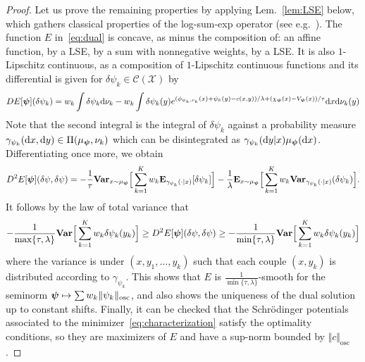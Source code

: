 \documentclass[11pt]{article}
\newcommand{\rev}[1]{{#1}}
\newcommand{\Cc}{\mathcal{C}}
\newcommand{\Xx}{\mathcal{X}}
\newcommand{\E}{\mathbf{E}}
\renewcommand{\d}{\mathrm{d}}
\begin{document}
\begin{proof}
\rev{Let us prove the remaining properties by applying Lem.~\ref{lem:LSE} below, which gathers classical properties of the log-sum-exp operator (see e.g.~\cite[Ex.~3.14]{boyd2004convex}).} The function $E$ in~\eqref{eq:dual} is concave, as minus the composition of: an affine function, by a LSE, by a sum with nonnegative weights, by a LSE. It is also $1$-Lipschitz continuous, as a composition of $1$-Lipschitz continuous functions and its differential is given for $\delta \psi_k\in \Cc(\Xx)$ by
\begin{align*}
DE[\bpsi](\delta \psi_k) = w_k\int \delta \psi_k\d\nu_k - w_k\int \delta \psi_k(y)e^{(\phi_{\psi_k,\nu_k}(x)+\psi_k(y)-c(x,y))/\lambda +(\chi_\bpsi(x)-V_\bpsi(x))/\tau}\d x \d\nu_k(y)
\end{align*}
Note that the second integral is the integral of $\delta \psi_k$ against a probability measure $\gamma_{\psi_k}(\d x,\d y) \in \Pi(\mu_\bpsi,\nu_k)$ which can be disintegrated as $\gamma_{\psi_k}(\d y|x)\mu_\bpsi(\d x)$. Differentiating once more, we obtain
\begin{align*}
D^2E[\bpsi](\delta \psi,\delta \psi) =-\frac{1}{\tau} \mathbf{Var}_{x\sim \mu_\bpsi}\Big[\sum_{k=1}^K w_k \E_{\gamma_{\psi_k}(\cdot |x)} [\delta \psi_k]\Big] -\frac{1}{\lambda}\E_{x\sim \mu_\bpsi}\Big[\sum_{k=1}^K w_k \mathbf{Var}_{\gamma_{\psi_k}(\cdot|x)}(\delta \psi_k)\Big].
\end{align*}
It follows by the law of total variance that 
$$
-\frac{1}{ \max\{\tau,\lambda\}} \mathbf{Var}\Big[  \sum_{k=1}^K w_k\delta \psi_k(y_k) \Big] \geq D^2E[{\boldsymbol{\psi}}](\delta \psi,\delta \psi) \geq -\frac{1}{ \min\{\tau,\lambda\}} \mathbf{Var}\Big[  \sum_{k=1}^K w_k\delta \psi_k(y_k) \Big] 
$$
where the variance is under $(x,y_1,\dots,y_k)$ such that each couple $(x,y_k)$ is distributed according to $ \gamma_{\psi_k}$. This shows that $E$ is $\frac{1}{ \min\{\tau,\lambda\}}$-smooth for the seminorm ${\boldsymbol{\psi}}\mapsto \sum w_k \Vert \psi_k\Vert_\mathrm{osc}$, and also shows the uniqueness of the dual solution up to constant shifts. Finally, it can be checked that the Schr\"odinger potentials associated to the minimizer~\eqref{eq:characterization} satisfy the optimality conditions, so they are maximizers of $E$ and have a sup-norm bounded by $\Vert c\Vert_{\mathrm{osc}}$.
\end{proof}
\end{document}
